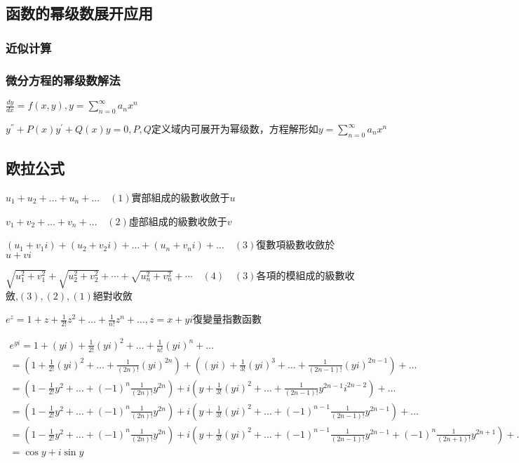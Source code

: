 \documentclass[UTF8]{ctexart}
\newcommand{\mt}[1]{\text{#1}}
\newcommand{\mf}[1]{\left( #1\right)}
\newcommand{\q}{\quad}
\newcommand{\ma}[1]{\begin{array}{llll} #1 \end{array}}
\newcommand{\jisu}[1]{\sum_{n=0}^\infty #1}
\begin{document}
\subsection{函数的幂级数展开应用 }

\subsubsection{近似计算 }

\subsubsection{微分方程的幂级数解法 }

$\frac{dy}{dx}=f\mf{x,y},y=\jisu{a_nx^n}$

$y^{''}+P\mf{x}y^{'}+Q\mf{x}y=0,P,Q\mt{定义域内可展开为幂级数，方程解形如}y=\jisu{a_nx^n}$


\subsection{欧拉公式 }




$ u_1+u_2+\dots+u_n+\dots  \q \mf{1}$實部組成的級數收斂于$u$

$v_1+v_2+\dots+v_n+\dots  \q \mf{2}$虛部組成的級數收斂于$v$

$\mf{u_1+v_1i}+\mf{u_2+v_2i}+\dots+\mf{u_n+v_ni}+\dots  \q \mf{3}$復數項級數收斂於$u+vi$

$\sqrt{u_1^2+v_1^2}+\sqrt{u_2^2+v_2^2}+\cdots+\sqrt{u_n^2+v_n^2}+\cdots \q \mf{4} \q \mf{3}$各項的模組成的級數收斂,$\mf{3},\mf{2},\mf{1}$絕對收斂
 


$e^z=1+z+\frac{1}{2!}z^2+\dots+\frac{1}{n!}z^n+\dots,z=x+yi$復變量指數函數

$\ma{e^{yi}=1+\mf{yi}+\frac{1}{2!}\mf{yi}^2+\dots+\frac{1}{n!}\mf{yi}^n+\dots\\
    =\mf{1+\frac{1}{2!}\mf{yi}^2+\dots+ \frac{1}{\mf{2n}!}\mf{yi}^{2n}}+\mf{\mf{yi}+\frac{1}{3!}\mf{yi}^3+\dots+ \frac{1}{\mf{2n-1}!}\mf{yi}^{2n-1}}+\dots\\
    =\mf{1-\frac{1}{2!}y^2+\dots+ \mf{-1}^n\frac{1}{\mf{2n}!}y^{2n}}+
    i\mf{y+\frac{1}{3!}\mf{yi}^2+\dots+ \frac{1}{\mf{2n-1}!}y^{2n-1}i^{2n-2}}+\dots\\
    =\mf{1-\frac{1}{2!}y^2+\dots+ \mf{-1}^n\frac{1}{\mf{2n}!}y^{2n}}+
    i\mf{y+\frac{1}{3!}\mf{yi}^2+\dots+ \mf{-1}^{n-1}\frac{1}{\mf{2n-1}!}y^{2n-1}}+\dots\\
    =\mf{1-\frac{1}{2!}y^2+\dots+ \mf{-1}^n\frac{1}{\mf{2n}!}y^{2n}}+
    i\mf{y+\frac{1}{3!}\mf{yi}^2+\dots+ \mf{-1}^{n-1}\frac{1}{\mf{2n-1}!}y^{2n-1}+ \mf{-1}^{n}\frac{1}{\mf{2n+1}!}y^{2n+1}}+\dots\\
    =\cos y + i \sin y\\
}$
\end{document}
